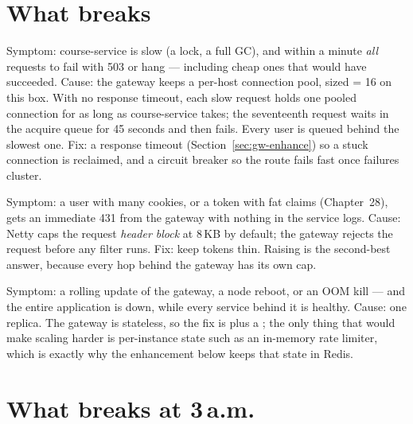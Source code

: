 \section{What breaks}

\begin{pitfall}
Symptom: course-service is slow (a lock, a full GC), and within a minute
\emph{all} requests to  fail with 503 or hang ---
including cheap ones that would have succeeded. Cause: the gateway keeps
a per-host connection pool, sized  = 16
on this box. With no response timeout, each slow request holds one
pooled connection for as long as course-service takes; the seventeenth
request waits in the acquire queue for 45 seconds and then fails. Every
user is queued behind the slowest one. Fix: a response timeout
(Section~\ref{sec:gw-enhance}) so a stuck connection is reclaimed, and a
circuit breaker so the route fails fast once failures cluster.
\end{pitfall}

\begin{pitfall}
Symptom: a user with many cookies, or a token with fat claims
(Chapter~28), gets an immediate 431 from the gateway with nothing in the
service logs. Cause: Netty caps the request \emph{header block} at
8\,KB by default; the gateway rejects the request before any filter
runs. Fix: keep tokens thin. Raising
 is the second-best answer,
because every hop behind the gateway has its own cap.
\end{pitfall}

\begin{pitfall}
Symptom: a rolling update of the gateway, a node reboot, or an OOM kill
--- and the entire application is down, while every service behind it
is healthy. Cause: one replica. The gateway is stateless, so the fix is
 plus a ; the only thing
that would make scaling harder is per-instance state such as an
in-memory rate limiter, which is exactly why the enhancement below keeps
that state in Redis.
\end{pitfall}

\section{What breaks at 3\,a.m.}

